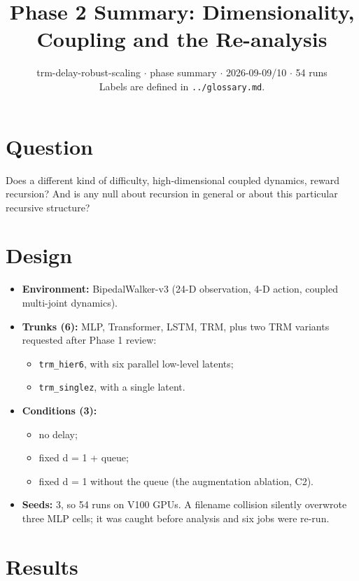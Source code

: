 \documentclass[11pt]{article}
\title{Phase 2 Summary: Dimensionality, Coupling and the Re-analysis}
\author{}
\date{trm-delay-robust-scaling $\cdot$ phase summary $\cdot$ 2026-09-09/10 $\cdot$ 54 runs\\[2pt]Labels are defined in \texttt{.\allowbreak{}.\allowbreak{}/\allowbreak{}glossary.\allowbreak{}md}.}
\begin{document}
\maketitle
\section*{Question}



Does a different kind of difficulty, high-dimensional coupled dynamics, reward recursion? And is any null about recursion in general or about this particular recursive structure?



\section*{Design}



\begin{itemize}
\item \textbf{Environment:} BipedalWalker-v3 (24-D observation, 4-D action, coupled multi-joint dynamics).
\item \textbf{Trunks (6):} MLP, Transformer, LSTM, TRM, plus two TRM variants requested after Phase 1 review:
\begin{itemize}
\item \texttt{trm\_hier6}, with six parallel low-level latents;
\item \texttt{trm\_singlez}, with a single latent.
\end{itemize}
\item \textbf{Conditions (3):}
\begin{itemize}
\item no delay;
\item fixed d = 1 + queue;
\item fixed d = 1 without the queue (the augmentation ablation, C2).
\end{itemize}
\item \textbf{Seeds:} 3, so 54 runs on V100 GPUs. A filename collision silently overwrote three MLP cells; it was caught before analysis and six jobs were re-run.
\end{itemize}



\section*{Results}
\end{document}
